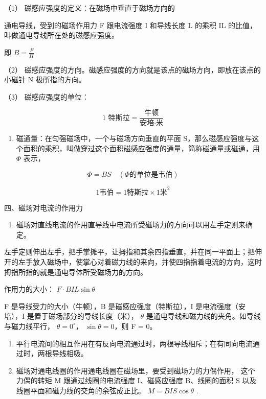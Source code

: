（1） 磁感应强度的定义：在磁场中垂直于磁场方向的

通电导线，受到的磁场作用力 F 跟电流强度 I 和导线长度 L 的乘积 IL
的比值，叫做通电导线所在处的磁感应强度。

即 \(B = \frac{F}{II}\)

（2）
磁感应强度的方向。磁感应强度的方向就是该点的磁场方向，即放在该点的小磁针
N 极所指的方向。

（3） 磁感应强度的单位：

\[
\text{1 特斯拉} = \frac{\text{牛顿}}{\text{安培} \cdot \text{米}}
\]

\begin{enumerate}
\def\labelenumi{\arabic{enumi}.}
\setcounter{enumi}{1}
\tightlist
\item
  磁通量：在匀强磁场中，一个与磁场方向垂直的平面
  S，那么磁感应强度与这个面积的乘积，叫做穿过这个面积磁感应强度的通量，简称磁通量或磁通，用
  \(\Phi\) 表示，
\end{enumerate}

\[
\Phi = B S \quad (\Phi \text{的单位是韦伯})
\]

\[
1 \text{韦伯} = 1 \text{特斯拉} \times 1 \text{米}^{2}
\]

四、磁场对电流的作用力

\begin{enumerate}
\def\labelenumi{\arabic{enumi}.}
\tightlist
\item
  磁场对直线电流的作用直导线中电流所受磁场力的方向可以用左手定则来确定。
\end{enumerate}

左手定则伸出左手，把手掌摊平，让拇指和其余四指垂直，并在同一平面上；把伸开的左手放入磁场中，使掌心对着磁力线的来向，并使四指指着电流的方向，这时拇指所指的就是通电导体所受磁场力的方向。

作用力的大小： \(F \cdot BIL \sin \theta\)

F 是导线受力的大小（牛顿），B 是磁感应强度（特斯拉），I
是电流强度（安培），I 是置于磁场部分的导线长度（米）， \(\theta\)
是通电导线和磁力线的夹角。如导线与磁力线平行， \(\theta = 0^{\circ}\)，
\(\sin \theta = 0\)，则 F = 0。

\begin{enumerate}
\def\labelenumi{\arabic{enumi}.}
\setcounter{enumi}{1}
\item
  平行电流间的相互作用在有反向电流通过时，两根导线相斥；在有同向电流通过时，两根导线相吸。
\item
  磁场对通电线圈的作用通电线圈在磁场里，要受到磁场力的力偶作用，
  这个力偶的转矩 M 跟通过线圈的电流强度 I、磁感应强度 B、线圈的面积 S
  以及线圈平面和磁力线的交角的余弦成正比。 \(M = BIS \cos \theta\) .
\end{enumerate}


